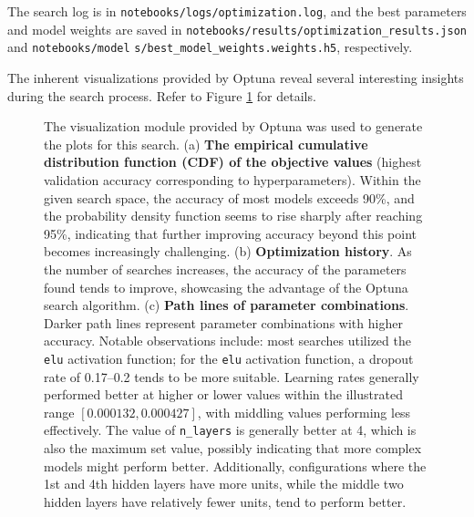 \documentclass{article}
\begin{document}
The search log is in \texttt{notebooks/logs/optimization.log}, and the best parameters and model weights are saved in \texttt{notebooks/results/optimization\_results.json} and \texttt{notebooks/model} \texttt{s/best\_model\_weights.weights.h5}, respectively.

The inherent visualizations provided by Optuna reveal several interesting insights during the search process. Refer to Figure \ref{fig:three_figs} for details.

\begin{figure}[!htbp]
    \centering
    \hspace{0.0\textwidth}
    \hspace{0.0\textwidth}
    \caption{The visualization module provided by Optuna was used to generate the plots for this search. (a) \textbf{The empirical cumulative distribution function (CDF) of the objective values} (highest validation accuracy corresponding to hyperparameters). Within the given search space, the accuracy of most models exceeds 90\%, and the probability density function seems to rise sharply after reaching 95\%, indicating that further improving accuracy beyond this point becomes increasingly challenging. (b) \textbf{Optimization history}. As the number of searches increases, the accuracy of the parameters found tends to improve, showcasing the advantage of the Optuna search algorithm. (c) \textbf{Path lines of parameter combinations}. Darker path lines represent parameter combinations with higher accuracy. Notable observations include: most searches utilized the \texttt{elu} activation function; for the \texttt{elu} activation function, a dropout rate of 0.17–0.2 tends to be more suitable. Learning rates generally performed better at higher or lower values within the illustrated range $[0.000132, 0.000427]$, with middling values performing less effectively. The value of \texttt{n\_layers} is generally better at 4, which is also the maximum set value, possibly indicating that more complex models might perform better. Additionally, configurations where the 1st and 4th hidden layers have more units, while the middle two hidden layers have relatively fewer units, tend to perform better.
}
    \label{fig:three_figs}
\end{figure}
\end{document}
